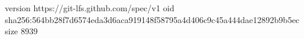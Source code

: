 version https://git-lfs.github.com/spec/v1
oid sha256:564bb28f7d6574eda3d6aca919148f58795a4d406c9c45a444dae12892b9b5ec
size 8939
